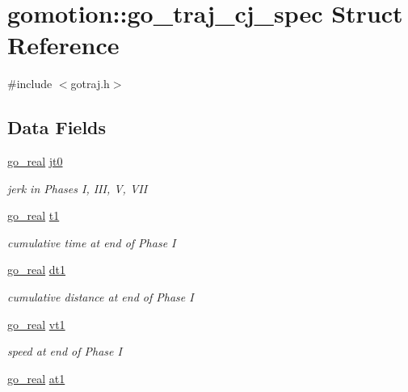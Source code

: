 \hypertarget{structgomotion_1_1go__traj__cj__spec}{\section{gomotion\-:\-:go\-\_\-traj\-\_\-cj\-\_\-spec Struct Reference}
\label{structgomotion_1_1go__traj__cj__spec}
}


{\ttfamily \#include $<$gotraj.\-h$>$}

\subsection*{Data Fields}
\begin{DoxyCompactItemize}
\item 
\hyperlink{gotypes_8h_afd666a2393eebd71ee455846ac9def9b}{go\-\_\-real} \hyperlink{structgomotion_1_1go__traj__cj__spec_a1648dabad4bde3ac763637ff03e7569e}{jt0}
\begin{DoxyCompactList}\small\item\em jerk in Phases I, I\-I\-I, V, V\-I\-I \end{DoxyCompactList}\item 
\hyperlink{gotypes_8h_afd666a2393eebd71ee455846ac9def9b}{go\-\_\-real} \hyperlink{structgomotion_1_1go__traj__cj__spec_a9c9e0e71237dfaa69c2baa659f39b4c2}{t1}
\begin{DoxyCompactList}\small\item\em cumulative time at end of Phase I \end{DoxyCompactList}\item 
\hyperlink{gotypes_8h_afd666a2393eebd71ee455846ac9def9b}{go\-\_\-real} \hyperlink{structgomotion_1_1go__traj__cj__spec_a27c49ef9ca002d4d1b5eeb66138a609a}{dt1}
\begin{DoxyCompactList}\small\item\em cumulative distance at end of Phase I \end{DoxyCompactList}\item 
\hyperlink{gotypes_8h_afd666a2393eebd71ee455846ac9def9b}{go\-\_\-real} \hyperlink{structgomotion_1_1go__traj__cj__spec_ab1380ff4964f85ab6fff5a68d7073485}{vt1}
\begin{DoxyCompactList}\small\item\em speed at end of Phase I \end{DoxyCompactList}\item 
\hyperlink{gotypes_8h_afd666a2393eebd71ee455846ac9def9b}{go\-\_\-real} \hyperlink{structgomotion_1_1go__traj__cj__spec_ae63aa2315ba83e5110d79408db7666a8}{at1}

\end{DoxyCompactItemize}
